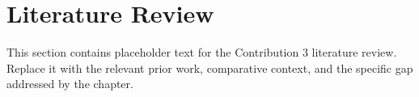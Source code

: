 \section{Literature Review}
\label{sec::contrib3::literature}

This section contains placeholder text for the Contribution 3 literature review. Replace it with the relevant prior work, comparative context, and the specific gap addressed by the chapter.
